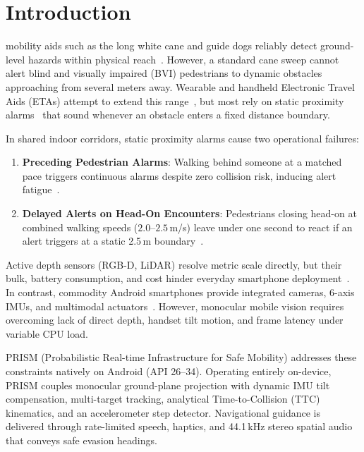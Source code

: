 \section{Introduction}
\label{sec:introduction}

 mobility aids such as the long white cane and guide dogs reliably detect ground-level hazards within physical reach~\cite{giudice2008blind,elmannai2017sensor,roentgen2008electronic}. However, a standard cane sweep cannot alert blind and visually impaired (BVI) pedestrians to dynamic obstacles approaching from several meters away. Wearable and handheld Electronic Travel Aids (ETAs) attempt to extend this range~\cite{dakopoulos2009wearable}, but most rely on static proximity alarms~\cite{tapu2020wearable,bai2017smart,shoval1998auditory} that sound whenever an obstacle enters a fixed distance boundary.

In shared indoor corridors, static proximity alarms cause two operational failures:
\begin{enumerate}
    \item \textbf{Preceding Pedestrian Alarms}: Walking behind someone at a matched pace triggers continuous alarms despite zero collision risk, inducing alert fatigue~\cite{tapu2020wearable}.
    \item \textbf{Delayed Alerts on Head-On Encounters}: Pedestrians closing head-on at combined walking speeds ($2.0\text{--}2.5$\,m/s) leave under one second to react if an alert triggers at a static 2.5\,m boundary~\cite{lin2021real}.
\end{enumerate}

Active depth sensors (RGB-D, LiDAR) resolve metric scale directly, but their bulk, battery consumption, and cost hinder everyday smartphone deployment~\cite{zhao2020visual}. In contrast, commodity Android smartphones provide integrated cameras, 6-axis IMUs, and multimodal actuators~\cite{faria2010electronic,tapu2020wearable}. However, monocular mobile vision requires overcoming lack of direct depth, handset tilt motion, and frame latency under variable CPU load.

PRISM (Probabilistic Real-time Infrastructure for Safe Mobility) addresses these constraints natively on Android (API 26--34). Operating entirely on-device, PRISM couples monocular ground-plane projection with dynamic IMU tilt compensation, multi-target tracking, analytical Time-to-Collision (TTC) kinematics, and an accelerometer step detector. Navigational guidance is delivered through rate-limited speech, haptics, and 44.1\,kHz stereo spatial audio~\cite{loomis1998navigation,bujacz2016sonification} that conveys safe evasion headings.

